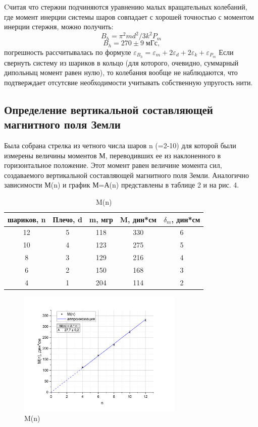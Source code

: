 \documentclass[a4paper, 12pt]{article}
\begin{document}
Cчитая что стержни подчиняются уравнению малых вращательных колебаний, где момент инерции системы шаров совпадает с хорошей точностью с моментом инерции стержня, можно получить:
\begin{equation}B_{h}=\pi^{2} m d^{2} / 3 k^{2} P_{m}\end{equation}
\begin{displaymath} B_{h}= 270 \pm 9 \; \text{мГс,} \end{displaymath}
погрешность рассчитывалась по формуле $\varepsilon_{B_{h}}=\varepsilon_{m}+2 \varepsilon_{d}+2 \varepsilon_{k}+\varepsilon_{P_{m}}$
Если свернуть систему из шариков в кольцо (для которого, очевидно, суммарный дипольныц момент равен нулю), то колебания вообще не наблюдаются, что подтверждает отсутсвие необходимости учитывать собственную упругость нити.
\subsection{Определение вертикальной составляющей магнитного поля Земли}
Была собрана стрелка из четного числа шаров n (=2-10) для которой были измерены величины моментов М, переводивших ее из наклоненного в горизонтальное положение. Этот момент равен величине момента сил, создаваемого вертикальной составляющей магнитного поля Земли. Аналогично зависимости М(n) и график М=А(n) представлены в таблице 2 и на рис. 4.
\begin{table}[h!]
\begin{center}
\caption{M(n)}
\begin{tabular}{|c|c|c|c|c|}
\hline
шариков, n & Плечо, d & m, мгр & M, дин*см & $\delta_{m}$, дин*см \\ \hline
12         & 5        & 118    & 330       & 6  \\
10         & 4        & 123    & 275       & 5  \\
8          & 3        & 129    & 216       & 4  \\
6          & 2        & 150    & 168       & 3  \\
4          & 1        & 204    & 114       & 2  \\ \hline
\end{tabular}
\end{center}
\end{table}
\begin{figure}
    \begin{center}
    \includegraphics[width=0.7\textwidth]{M(n).png}
    \end{center}
    \caption{M(n)}
    \end{figure}
\end{document}

